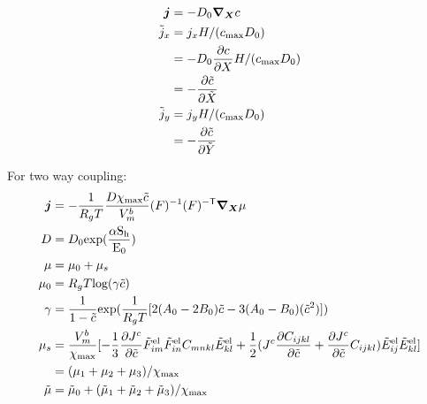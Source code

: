 \documentclass[../main.tex]{subfiles}
\begin{document}
\begin{align}
 \bm{j} &= -D_0 \bm{\nabla}_{\bm{X}}{c} \\
  \tilde{j}_x &= j_x H/({c_{\rm{max}}} D_0)\\
                                &= -D_0 \frac{\partial c}{\partial X} H/({c_{\rm{max}}} D_0)\\
                                &= -\frac{\partial \tilde{c}}{\partial \tilde{X}}\\
                    \tilde{j}_y &= j_y H/({c_{\rm{max}}} D_0)\\
                    &= -\frac{\partial \tilde{c}}{\partial \tilde{Y}}
\end{align}


For two way coupling:
\begin{align}
    \bm{j} &= - \frac{1}{R_g T} \frac{D\chi_{{\rm{max}}} \tilde{c}}{V^b_m} (F)^{-1} (F)^{{-\sf {T}}} \bm{\nabla}_{\bm{X}} \mu \\
    D &= D_0 \rm{exp}(\frac{\alpha S_h}{E_0}) \\
    \mu &= \mu_0 + \mu_s \\
    \mu_0 &= R_g T \text{log}(\gamma \tilde{c})\\
    \gamma &= \frac{1}{1-\tilde{c}}\text{exp}(\frac{1}{R_g T}[2(A_0 - 2B_0)\tilde{c} - 3(A_0 - B_0)(\tilde{c}^2)])\\
    \mu_s &= \frac{V_m^b}{\chi_{{\rm{max}}}}[-\frac{1}{3}\frac{\partial {J^c}}{\partial \tilde{c}}\tilde{F}_{im}^{{\rm{el}}}\tilde{F}_{in}^{{\rm{el}}}{C}_{mnkl}\tilde{E}_{kl}^{{\rm{el}}} + \frac{1}{2}({J^c} \frac{\partial C_{ijkl}}{\partial \tilde{c}} + \frac{\partial {J^c}}{\partial \tilde{c}} C_{ijkl})\tilde{E}_{ij}^{{\rm{el}}}\tilde{E}_{kl}^{{\rm{el}}}] \\ &= (\mu_1 + \mu_2 + \mu_3)/\chi_{{\rm{max}}}\\
    \tilde{\mu} &= \tilde{\mu}_0 + (\tilde{\mu}_1 + \tilde{\mu}_2 + \tilde{\mu}_3)/\chi_{{\rm{max}}}
\end{align}
\end{document}
